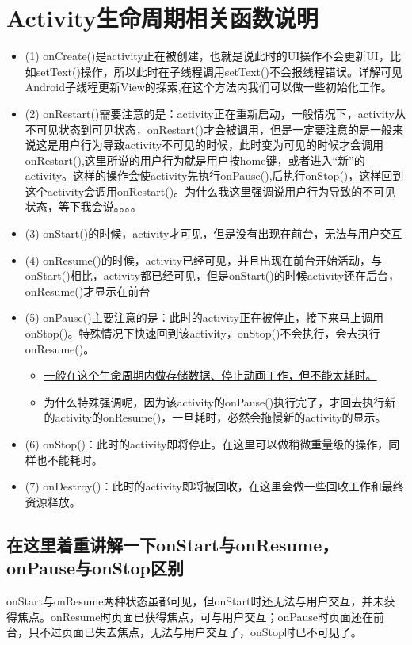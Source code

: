 \documentclass[9pt, b5paaper]{book}
\begin{document}
\section{Activity生命周期相关函数说明}
\label{sec-1-1}
\begin{itemize}
\item (1) onCreate()是activity正在被创建，也就是说此时的UI操作不会更新UI，比如setText()操作，所以此时在子线程调用setText()不会报线程错误。详解可见Android子线程更新View的探索,在这个方法内我们可以做一些初始化工作。
\item (2) onRestart()需要注意的是：activity正在重新启动，一般情况下，activity从不可见状态到可见状态，onRestart()才会被调用，但是一定要注意的是一般来说这是用户行为导致activity不可见的时候，此时变为可见的时候才会调用onRestart(),这里所说的用户行为就是用户按home键，或者进入“新”的activity。这样的操作会使activity先执行onPause(),后执行onStop()，这样回到这个activity会调用onRestart()。为什么我这里强调说用户行为导致的不可见状态，等下我会说。。。。
\item (3) onStart()的时候，activity才可见，但是没有出现在前台，无法与用户交互
\item (4) onResume()的时候，activity已经可见，并且出现在前台开始活动，与onStart()相比，activity都已经可见，但是onStart()的时候activity还在后台，onResume()才显示在前台
\item (5) onPause()主要注意的是：此时的activity正在被停止，接下来马上调用onStop()。特殊情况下快速回到该activity，onStop()不会执行，会去执行onResume()。
\begin{itemize}
\item \uline{一般在这个生命周期内做存储数据、停止动画工作，但不能太耗时。}
\item 为什么特殊强调呢，因为该activity的onPause()执行完了，才回去执行新的activity的onResume()，一旦耗时，必然会拖慢新的activity的显示。
\end{itemize}
\item (6) onStop()：此时的activity即将停止。在这里可以做稍微重量级的操作，同样也不能耗时。
\item (7) onDestroy()：此时的activity即将被回收，在这里会做一些回收工作和最终资源释放。
\end{itemize}
\subsection{在这里着重讲解一下onStart与onResume，onPause与onStop区别}
\label{sec-1-1-1}
onStart与onResume两种状态虽都可见，但onStart时还无法与用户交互，并未获得焦点。onResume时页面已获得焦点，可与用户交互；onPause时页面还在前台，只不过页面已失去焦点，无法与用户交互了，onStop时已不可见了。
\end{document}
